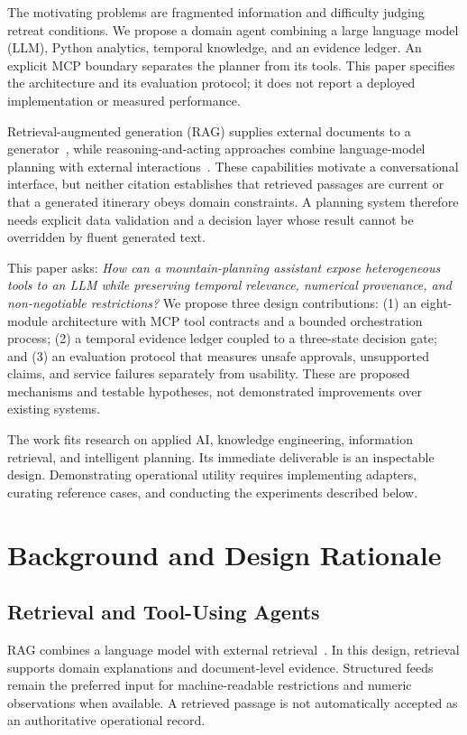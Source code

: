 \documentclass[conference]{IEEEtran}
\begin{document}
The motivating problems are fragmented information and difficulty judging retreat conditions. We propose a domain agent combining a large language model (LLM), Python analytics, temporal knowledge, and an evidence ledger. An explicit MCP boundary separates the planner from its tools. This paper specifies the architecture and its evaluation protocol; it does not report a deployed implementation or measured performance.

Retrieval-augmented generation (RAG) supplies external documents to a generator~\cite{rag}, while reasoning-and-acting approaches combine language-model planning with external interactions~\cite{react}. These capabilities motivate a conversational interface, but neither citation establishes that retrieved passages are current or that a generated itinerary obeys domain constraints. A planning system therefore needs explicit data validation and a decision layer whose result cannot be overridden by fluent generated text.

This paper asks: \emph{How can a mountain-planning assistant expose heterogeneous tools to an LLM while preserving temporal relevance, numerical provenance, and non-negotiable restrictions?} We propose three design contributions: (1) an eight-module architecture with MCP tool contracts and a bounded orchestration process; (2) a temporal evidence ledger coupled to a three-state decision gate; and (3) an evaluation protocol that measures unsafe approvals, unsupported claims, and service failures separately from usability. These are proposed mechanisms and testable hypotheses, not demonstrated improvements over existing systems.

The work fits research on applied AI, knowledge engineering, information retrieval, and intelligent planning. Its immediate deliverable is an inspectable design. Demonstrating operational utility requires implementing adapters, curating reference cases, and conducting the experiments described below.

\section{Background and Design Rationale}
\subsection{Retrieval and Tool-Using Agents}
RAG combines a language model with external retrieval~\cite{rag}. In this design, retrieval supports domain explanations and document-level evidence. Structured feeds remain the preferred input for machine-readable restrictions and numeric observations when available. A retrieved passage is not automatically accepted as an authoritative operational record.
\end{document}
